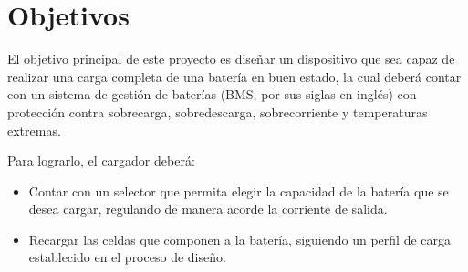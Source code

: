\section{Objetivos}

El objetivo principal de este proyecto es diseñar un dispositivo que sea capaz de realizar
una carga completa de una batería en buen estado,
la cual deberá contar con un sistema de gestión de baterías (BMS, por sus siglas en inglés)
con protección contra sobrecarga, sobredescarga, sobrecorriente y temperaturas extremas.

Para lograrlo, el cargador deberá:
\begin{itemize}
    \item Contar con un selector que permita elegir la capacidad de la batería que se desea cargar, regulando de manera acorde la corriente de salida.
    \item Recargar las celdas que componen a la batería, siguiendo un perfil de carga establecido en el proceso de diseño.
\end{itemize}